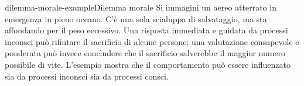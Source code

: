 \documentclass[preview]{standalone}
\begin{document}
\begin{snippetexample}{dilemma-morale-example}{Dilemma morale}
    Si immagini un aereo atterrato in emergenza in pieno oceano. C'è una sola
    scialuppa di salvataggio, ma sta affondando per il peso eccessivo. Una
    risposta immediata e guidata da processi inconsci può rifiutare il sacrificio
    di alcune persone; una valutazione consapevole e ponderata può invece
    concludere che il sacrificio salverebbe il maggior numero possibile di vite.
    L'esempio mostra che il comportamento può essere influenzato sia da processi
    inconsci sia da processi consci.
\end{snippetexample}
\end{document}
